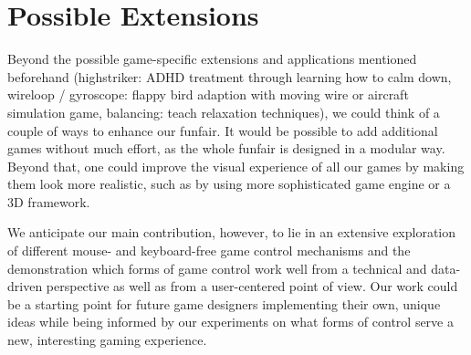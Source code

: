 \documentclass{utue} %
\begin{document}
\section{Possible Extensions}

Beyond the possible game-specific extensions and applications mentioned beforehand (highstriker: ADHD treatment through learning how to calm down, wireloop / gyroscope: flappy bird adaption with moving wire or aircraft simulation game, balancing: teach relaxation techniques), we could think of a couple of ways to enhance our funfair. It would be possible to add additional games without much effort, as the whole funfair is designed in a modular way. Beyond that, one could improve the visual experience of all our games by making them look more realistic, such as by using more sophisticated game engine or a 3D framework.

We anticipate our main contribution, however, to lie in an extensive exploration of different mouse- and keyboard-free game control mechanisms and the demonstration which forms of game control work well from a technical and data-driven perspective as well as from a user-centered point of view. Our work could be a starting point for future game designers implementing their own, unique ideas while being informed by our experiments on what forms of control serve a new, interesting gaming experience.



\end{document}
